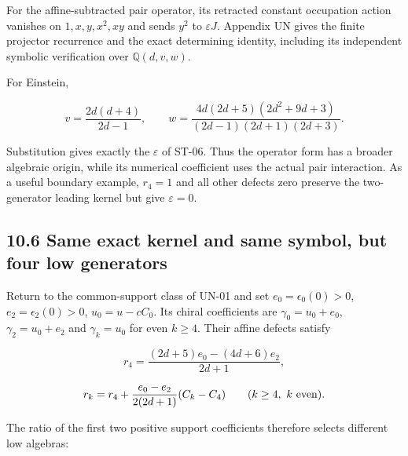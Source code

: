For the affine-subtracted pair operator, its retracted constant occupation action vanishes on \(1,x,y,x^2,xy\) and sends \(y^2\) to \(\varepsilon J\). Appendix UN gives the finite projector recurrence and the exact determining identity, including its independent symbolic verification over \(\mathbb Q(d,v,w)\).

For Einstein,

\[
v=\frac{2d(d+4)}{2d-1},\qquad
w=\frac{4d(2d+5)(2d^2+9d+3)}
{(2d-1)(2d+1)(2d+3)}.
\]

Substitution gives exactly the \(\varepsilon\) of ST-06. Thus the operator form has a broader algebraic origin, while its numerical coefficient uses the actual pair interaction. As a useful boundary example, \(r_4=1\) and all other defects zero preserve the two-generator leading kernel but give \(\varepsilon=0\).

\hypertarget{same-exact-kernel-and-same-symbol-but-four-low-generators}{%
\subsection{10.6 Same exact kernel and same symbol, but four low generators}\label{same-exact-kernel-and-same-symbol-but-four-low-generators}}

Return to the common-support class of UN-01 and set \(e_0=\epsilon_0(0)>0\), \(e_2=\epsilon_2(0)>0\), \(u_0=u-cC_0\). Its chiral coefficients are \(\gamma_0=u_0+e_0\), \(\gamma_2=u_0+e_2\) and \(\gamma_k=u_0\) for even \(k\geq4\). Their affine defects satisfy

\[
r_4=\frac{(2d+5)e_0-(4d+6)e_2}{2d+1},
\]

\[
r_k=r_4+\frac{e_0-e_2}{2(2d+1)}(C_k-C_4)
\qquad(k\geq4,\ k\ {\rm even}).
\]

The ratio of the first two positive support coefficients therefore selects different low algebras:

